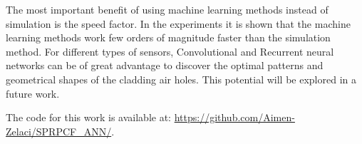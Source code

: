 \documentclass[10pt]{IEEEtran}
\begin{document}
The most important benefit of using machine learning methods instead of simulation is the speed factor. In the experiments it is shown that the machine learning methods work few orders of magnitude faster than the simulation method. For different types of sensors, Convolutional and Recurrent neural networks can be of great advantage to discover the optimal patterns and geometrical shapes of the cladding air holes. This potential will be explored in a future work.

The code for this work is available at: \url{https://github.com/Aimen-Zelaci/SPRPCF_ANN/}.


	
\end{document}
